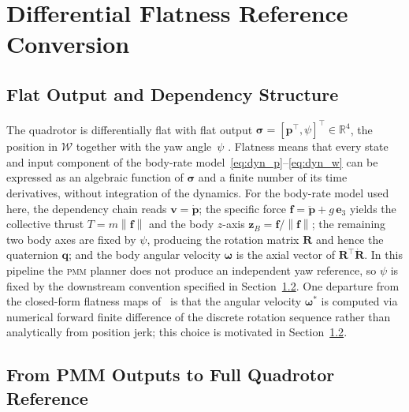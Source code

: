 \documentclass{ieeeaccess}
\newcommand{\R}{\mathbb{R}}
\newcommand{\norm}[1]{\left\| #1 \right\|}
\newcommand{\vect}[1]{\bm{#1}}
\newcommand{\mat}[1]{\mathbf{#1}}
\newcommand{\pmm}{\textsc{pmm}}
\begin{document}
\section{Differential Flatness Reference Conversion}
\label{sec:flatness}

\subsection{Flat Output and Dependency Structure}
\label{sec:flat_output}

The quadrotor is differentially flat with flat output
$\vect{\sigma}=[\vect{p}^\top,\psi]^\top\in\R^4$, the position in
$\mathcal{W}$ together with the yaw angle~$\psi$
\cite{mellinger2011minimum,faessler2018differential}.
Flatness means that every state and input component of the body-rate
model~\eqref{eq:dyn_p}--\eqref{eq:dyn_w} can be expressed as an algebraic
function of $\vect{\sigma}$ and a finite number of its time derivatives,
without integration of the dynamics.
For the body-rate model used here, the dependency chain reads
$\vect{v}=\dot{\vect{p}}$;
the specific force $\vect{f}=\ddot{\vect{p}}+g\,\vect{e}_3$ yields the
collective thrust $T=m\norm{\vect{f}}$ and the body $z$-axis
$\vect{z}_B=\vect{f}/\norm{\vect{f}}$; the remaining two body axes are
fixed by $\psi$, producing the rotation matrix $\mat{R}$ and hence the
quaternion $\vect{q}$; and the body angular velocity $\vect{\omega}$ is
the axial vector of $\mat{R}^\top\dot{\mat{R}}$.
In this pipeline the \pmm{} planner does not produce an independent yaw
reference, so $\psi$ is fixed by the downstream convention specified
in Section~\ref{sec:flat_map}.
One departure from the closed-form flatness maps
of~\cite{mellinger2011minimum,faessler2018differential} is that the
angular velocity $\vect{\omega}^*$ is computed via numerical forward
finite difference of the discrete rotation sequence rather than
analytically from position jerk; this choice is motivated in
Section~\ref{sec:flat_map}.

\subsection{From PMM Outputs to Full Quadrotor Reference}
\label{sec:flat_map}
\end{document}
